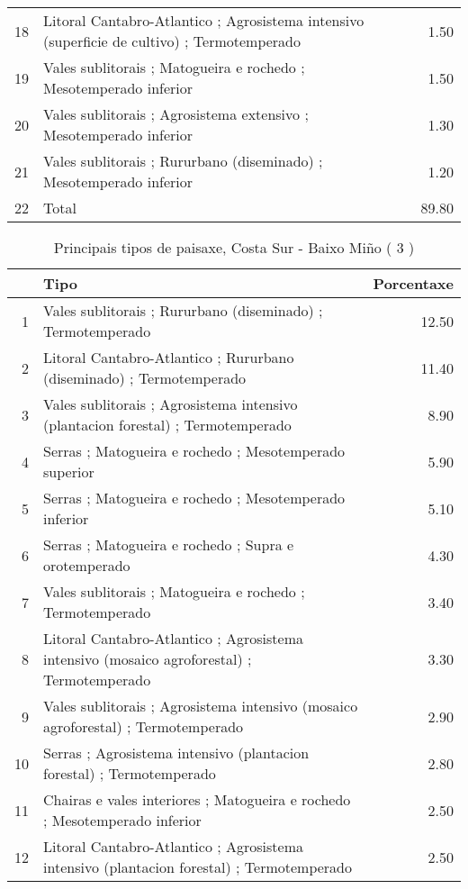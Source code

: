 \begin{table}[p]
\begin{tabular}{rlr}
  18 & Litoral Cantabro-Atlantico ; Agrosistema intensivo (superficie de cultivo) ; Termotemperado & 1.50 \\ 
  19 & Vales sublitorais ; Matogueira e rochedo ; Mesotemperado inferior & 1.50 \\ 
  20 & Vales sublitorais ; Agrosistema extensivo ; Mesotemperado inferior & 1.30 \\ 
  21 & Vales sublitorais ; Rururbano (diseminado) ; Mesotemperado inferior & 1.20 \\ 
  22 & Total & 89.80 \\ 
   \hline
\end{tabular}
\end{table}
\begin{table}[p]
\centering
\caption{Principais tipos de paisaxe,  Costa Sur - Baixo Miño ( 3 )} 
\label{Tipos 3}
\begin{tabular}{rlr}
  \hline
 & Tipo & Porcentaxe \\ 
  \hline
1 & Vales sublitorais ; Rururbano (diseminado) ; Termotemperado & 12.50 \\ 
  2 & Litoral Cantabro-Atlantico ; Rururbano (diseminado) ; Termotemperado & 11.40 \\ 
  3 & Vales sublitorais ; Agrosistema intensivo (plantacion forestal) ; Termotemperado & 8.90 \\ 
  4 & Serras ; Matogueira e rochedo ; Mesotemperado superior & 5.90 \\ 
  5 & Serras ; Matogueira e rochedo ; Mesotemperado inferior & 5.10 \\ 
  6 & Serras ; Matogueira e rochedo ; Supra e orotemperado & 4.30 \\ 
  7 & Vales sublitorais ; Matogueira e rochedo ; Termotemperado & 3.40 \\ 
  8 & Litoral Cantabro-Atlantico ; Agrosistema intensivo (mosaico agroforestal) ; Termotemperado & 3.30 \\ 
  9 & Vales sublitorais ; Agrosistema intensivo (mosaico agroforestal) ; Termotemperado & 2.90 \\ 
  10 & Serras ; Agrosistema intensivo (plantacion forestal) ; Termotemperado & 2.80 \\ 
  11 & Chairas e vales interiores ; Matogueira e rochedo ; Mesotemperado inferior & 2.50 \\ 
  12 & Litoral Cantabro-Atlantico ; Agrosistema intensivo (plantacion forestal) ; Termotemperado & 2.50 \\ 

\end{tabular}
\end{table}
